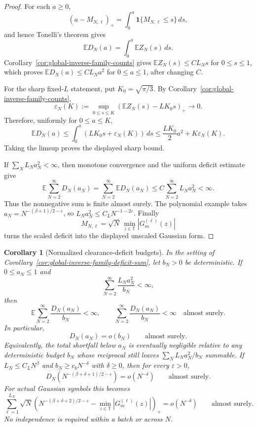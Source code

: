 \documentclass[11pt]{amsart}
\numberwithin{equation}{section}
\newtheorem{corollary}[theorem]{Corollary}
\theoremstyle{definition}
\theoremstyle{remark}
\newcommand{\T}{\mathbb T}
\newcommand{\Exp}{\mathbb E}
\newcommand{\eps}{\varepsilon}
\begin{document}
\begin{proof}
For each \(a\ge0\),
\[
  (a-M_{N,\ell})_+=\int_0^a \mathbf1\{M_{N,\ell}\le s\}\,ds,
\]
and hence Tonelli's theorem gives
\[
  \Exp D_N(a)=\int_0^a \Exp Z_N(s)\,ds .
\]
Corollary~\ref{cor:global-inverse-family-counts} gives
\(\Exp Z_N(s)\le CL_Ns\) for \(0\le s\le1\), which proves
\(\Exp D_N(a)\le CL_Na^2\) for \(0\le a\le1\), after changing \(C\).

For the sharp fixed-\(L\) statement, put \(K_0=\sqrt{\pi/3}\).  By
Corollary~\ref{cor:global-inverse-family-counts},
\[
  \varepsilon_N(K):=
  \sup_{0\le s\le K}
  \left(\Exp Z_N(s)-LK_0s\right)_+
  \longrightarrow0 .
\]
Therefore, uniformly for \(0\le a\le K\),
\[
  \Exp D_N(a)
  \le \int_0^a (LK_0s+\varepsilon_N(K))\,ds
  \le \frac{LK_0}{2}a^2+K\varepsilon_N(K).
\]
Taking the limsup proves the displayed sharp bound.

If \(\sum_N L_Na_N^2<\infty\), then monotone convergence and the uniform
deficit estimate give
\[
  \Exp\sum_{N=2}^\infty D_N(a_N)
  =
  \sum_{N=2}^\infty \Exp D_N(a_N)
  \le C\sum_{N=2}^\infty L_Na_N^2
  <\infty .
\]
Thus the nonnegative sum is finite almost surely.  The polynomial example takes
\(a_N=N^{-(\beta+1)/2-\eps}\), so
\(L_Na_N^2\le C_LN^{-1-2\eps}\).  Finally
\[
  M_{N,\ell}
  =
  \sqrt N\,\min_{z\in\T}|G_m^{(\ell)}(z)|
\]
turns the scaled deficit into the displayed unscaled Gaussian form.
\end{proof}

\begin{corollary}[Normalized clearance-deficit budgets]
\label{cor:global-inverse-family-deficit-budget}
In the setting of Corollary~\ref{cor:global-inverse-family-deficit-sum}, let
\(b_N>0\) be deterministic.  If \(0\le a_N\le1\) and
\[
  \sum_{N=2}^\infty \frac{L_Na_N^2}{b_N}<\infty,
\]
then
\[
  \Exp\sum_{N=2}^\infty \frac{D_N(a_N)}{b_N}<\infty,
  \qquad
  \sum_{N=2}^\infty \frac{D_N(a_N)}{b_N}<\infty
  \quad\text{almost surely}.
\]
In particular,
\[
  D_N(a_N)=o(b_N)
  \qquad\text{almost surely}.
\]
Equivalently, the total shortfall below \(a_N\) is eventually negligible
relative to any deterministic budget \(b_N\) whose reciprocal still leaves
\(\sum_N L_Na_N^2/b_N\) summable.  If \(L_N\le C_LN^\beta\) and
\(b_N\ge c_bN^{-\delta}\) with \(\delta\ge0\), then for every \(\eps>0\),
\[
  D_N\!\left(N^{-(\beta+\delta+1)/2-\eps}\right)
  =o\!\left(N^{-\delta}\right)
  \qquad\text{almost surely}.
\]
For actual Gaussian symbols this becomes
\[
  \sum_{\ell=1}^{L_N}
  \sqrt N\left(
    N^{-(\beta+\delta+2)/2-\eps}
    -\min_{z\in\T}|G_m^{(\ell)}(z)|
  \right)_+
  =
  o\!\left(N^{-\delta}\right)
  \qquad\text{almost surely}.
\]
No independence is required within a batch or across \(N\).
\end{corollary}
\end{document}
